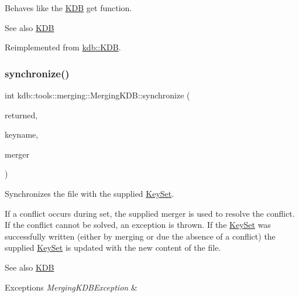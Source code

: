 Behaves like the \hyperlink{classkdb_1_1KDB}{K\+DB} get function. 

\begin{DoxySeeAlso}{See also}
\hyperlink{classkdb_1_1KDB}{K\+DB} 
\end{DoxySeeAlso}


Reimplemented from \hyperlink{classkdb_1_1KDB_a48770a7290699bf2b7529f3ab67e378f}{kdb\+::\+K\+DB}.

\mbox{\label{classkdb_1_1tools_1_1merging_1_1MergingKDB_ae7fb5bd354d16ed90bbf0c4c087b5d6f}} 
\subsubsection{\texorpdfstring{synchronize()}{synchronize()}\hspace{0.1cm}{\footnotesize\ttfamily [1/2]}}
{\footnotesize\ttfamily int kdb\+::tools\+::merging\+::\+Merging\+K\+D\+B\+::synchronize (\begin{DoxyParamCaption}\item[{\hyperlink{classkdb_1_1KeySet}{Key\+Set} \&}]{returned,  }\item[{std\+::string const \&}]{keyname,  }\item[{Three\+Way\+Merge \&}]{merger }\end{DoxyParamCaption})\hspace{0.3cm}{\ttfamily [virtual]}}



Synchronizes the file with the supplied \hyperlink{classkdb_1_1KeySet}{Key\+Set}. 

If a conflict occurs during set, the supplied merger is used to resolve the conflict. If the conflict cannot be solved, an exception is thrown. If the \hyperlink{classkdb_1_1KeySet}{Key\+Set} was successfully written (either by merging or due the absence of a conflict) the supplied \hyperlink{classkdb_1_1KeySet}{Key\+Set} is updated with the new content of the file.

\begin{DoxySeeAlso}{See also}
\hyperlink{classkdb_1_1KDB}{K\+DB} 
\end{DoxySeeAlso}

\begin{DoxyExceptions}{Exceptions}
{\em Merging\+K\+D\+B\+Exception} & \\
\hline
\end{DoxyExceptions}
\mbox{\label{classkdb_1_1tools_1_1merging_1_1MergingKDB_adcb436c4bf35c89c67ae2f5b3f1a9cfd}} 
